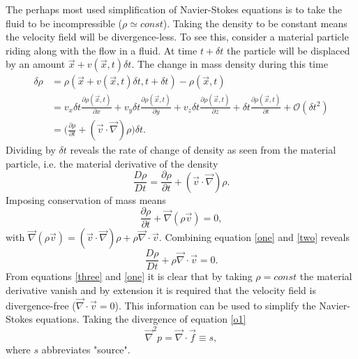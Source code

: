 \begin{example}
	The perhaps most used simplification of Navier-Stokes equations is to take the fluid to be incompressible ($\rho\simeq const$). Taking the density to be constant means the velocity field will be divergence-less. To see this, consider a material particle riding along with the flow in a fluid. At time $t+\delta t$ the particle will be displaced by an amount $\vec{x}+v(\vec{x},t)\delta t$. The change in mass density during this time
	\begin{equation}
		\begin{split}
			\delta \rho &=\rho(\vec{x}+v(\vec{x},t)\delta t,t+\delta t)-\rho(\vec{x},t)\\
			&= v_{x}\delta t\frac{\partial \rho (\vec{x},t)}{\partial x}+v_{y}\delta t\frac{\partial \rho (\vec{x},t)}{\partial y}+v_{z}\delta t\frac{\partial \rho (\vec{x},t)}{\partial z}+\delta t\frac{\partial \rho (\vec{x},t)}{\partial t}+\mathcal{O}(\delta t^2)\\
			&=\bigg(\frac{\partial \rho}{\partial t}+(\vec{v}\cdot \vec{\nabla})\rho\bigg)\delta t.
		\end{split}
	\end{equation}
	Dividing by $\delta t$ reveals the rate of change of density as seen from the material particle, i.e. the material derivative of the density
	\begin{equation}
		\frac{D \rho}{Dt}=\frac{\partial \rho}{\partial t}+(\vec{v}\cdot \vec{\nabla})\rho.
		\label{one}
	\end{equation}
	Imposing conservation of mass means
	\begin{equation}
		\frac{\partial \rho}{\partial t}+\vec{\nabla}(\rho\vec{v})=0,
		\label{two}
	\end{equation}
	with $\vec{\nabla}(\rho\vec{v})=(\vec{v}\cdot \vec{\nabla})\rho+\rho\vec{\nabla}\cdot \vec{v}$. Combining equation \eqref{one} and \eqref{two} reveals
	\begin{equation}
		\frac{D \rho}{Dt}+\rho\vec{\nabla}\cdot \vec{v}=0.
		\label{three}
	\end{equation}
	From equations \eqref{three} and \eqref{one} it is clear that by taking $\rho=const$ the material derivative vanish and by extension it is required that the velocity field is divergence-free ($\vec{\nabla}\cdot \vec{v}=0$). This information can be used to simplify the Navier-Stokes equations. Taking the divergence of equation \eqref{o1}
	\begin{equation}
		\vec{\nabla}^2p=\vec{\nabla}\cdot\vec{f}\equiv s,
		\label{o3}
	\end{equation}
	where $s$ abbreviates "source". 
\end{example}



